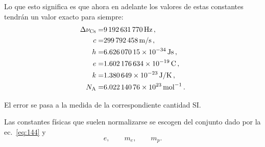 Lo que esto significa es que ahora en adelante los valores de estas constantes tendrán un valor exacto para siempre:
\begin{align*}
    \Delta\nu_{\text{Cs}}=& \SI{9 192 631 770}{Hz}\,,\\
    c=&\SI{ 299 792 458 }{m/s}\,,\\
    h=&\SI{ 6.62607015E-34 }{J s}\,,\\
     e=&\SI{1.602 176 634E-19}{C}\,,\\
     k=&\SI{1.380 649E-23}{J/K}\,,\\ 
     N_{\text{A}}=&\SI{6.022 140 76E23}{mol^{-1}}\,.  
\end{align*}

El error se pasa a la medida de la correspondiente cantidad SI.

Las constantes físicas que suelen normalizarse se escogen del conjunto dado por la ec.~\eqref{eq:144} y
\begin{equation}
  \label{eq:145}
  e,\qquad m_e,\qquad m_p.
\end{equation}

